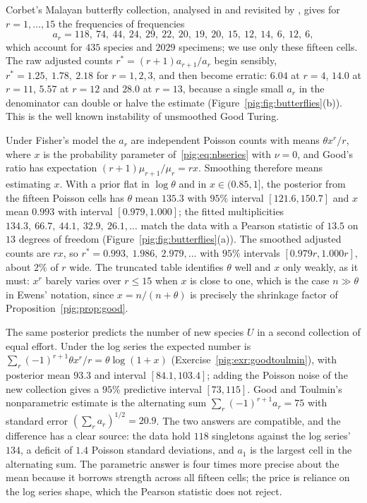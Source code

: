 \begin{example}\label{pig:ex:butterflies}
Corbet's Malayan butterfly collection, analysed in \citet{pig:fisher1943} and revisited by \citet[Chapter 6]{pig:efronhastie2016}, gives for $r=1,\dots,15$ the frequencies of frequencies
\[
a_r=118,\ 74,\ 44,\ 24,\ 29,\ 22,\ 20,\ 19,\ 20,\ 15,\ 12,\ 14,\ 6,\ 12,\ 6,
\]
which account for $435$ species and $2029$ specimens; we use only these fifteen cells. The raw adjusted counts $r^*=(r+1)a_{r+1}/a_r$ begin sensibly, $r^*=1.25,\ 1.78,\ 2.18$ for $r=1,2,3$, and then become erratic: $6.04$ at $r=4$, $14.0$ at $r=11$, $5.57$ at $r=12$ and $28.0$ at $r=13$, because a single small $a_r$ in the denominator can double or halve the estimate (Figure~\ref{pig:fig:butterflies}(b)). This is the well known instability of unsmoothed Good Turing.

Under Fisher's model the $a_r$ are independent Poisson counts with means $\theta x^r/r$, where $x$ is the probability parameter of~\eqref{pig:eq:nbseries} with $\nu=0$, and Good's ratio has expectation $(r+1)\mu_{r+1}/\mu_r=r x$. Smoothing therefore means estimating $x$. With a prior flat in $\log\theta$ and in $x\in(0.85,1]$, the posterior from the fifteen Poisson cells has $\theta$ mean $135.3$ with $95\%$ interval $[121.6, 150.7]$ and $x$ mean $0.993$ with interval $[0.979, 1.000]$; the fitted multiplicities $134.3,\ 66.7,\ 44.1,\ 32.9,\ 26.1,\dots$ match the data with a Pearson statistic of $13.5$ on $13$ degrees of freedom (Figure~\ref{pig:fig:butterflies}(a)). The smoothed adjusted counts are $r x$, so $r^*=0.993,\ 1.986,\ 2.979,\dots$ with $95\%$ intervals $[0.979r, 1.000r]$, about $2\%$ of $r$ wide. The truncated table identifies $\theta$ well and $x$ only weakly, as it must: $x^r$ barely varies over $r\le15$ when $x$ is close to one, which is the case $n\gg\theta$ in Ewens' notation, since $x=n/(n+\theta)$ is precisely the shrinkage factor of Proposition~\ref{pig:prop:good}.

The same posterior predicts the number of new species $U$ in a second collection of equal effort. Under the log series the expected number is $\sum_r(-1)^{r+1}\theta x^r/r=\theta\log(1+x)$ (Exercise~\ref{pig:exr:goodtoulmin}), with posterior mean $93.3$ and interval $[84.1, 103.4]$; adding the Poisson noise of the new collection gives a $95\%$ predictive interval $[73, 115]$. Good and Toulmin's nonparametric estimate is the alternating sum $\sum_r(-1)^{r+1}a_r=75$ with standard error $(\sum_r a_r)^{1/2}=20.9$. The two answers are compatible, and the difference has a clear source: the data hold $118$ singletons against the log series' $134$, a deficit of $1.4$ Poisson standard deviations, and $a_1$ is the largest cell in the alternating sum. The parametric answer is four times more precise about the mean because it borrows strength across all fifteen cells; the price is reliance on the log series shape, which the Pearson statistic does not reject.
\end{example}

